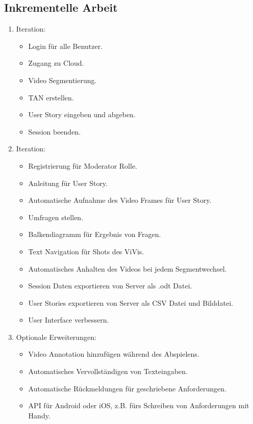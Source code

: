 	\subsection{Inkrementelle Arbeit}
		\begin{enumerate}
			\item Iteration:
			\begin{itemize}
				\item Login für alle Benutzer.
				\item Zugang zu Cloud.
				\item Video Segmentierung.
				\item TAN erstellen.
				\item User Story eingeben und abgeben.
				\item Session beenden.
			\end{itemize}
			\item Iteration:
			\begin{itemize}
				\item Registrierung für Moderator Rolle.
				\item Anleitung für User Story.
				\item Automatische Aufnahme des Video Frames für User Story.
				\item Umfragen stellen.
				\item Balkendiagramm für Ergebnis von Fragen.
				\item Text Navigation für Shots des ViVis.
				\item Automatisches Anhalten des Videos bei jedem Segmentwechsel.
				\item Session Daten exportieren von Server als .odt Datei.
				\item User Stories exportieren von Server als CSV Datei und Bilddatei.
				\item User Interface verbessern.
			\end{itemize}
			\item Optionale Erweiterungen:
			\begin{itemize}
				\item Video Annotation hinzufügen während des Abspielens.
				\item Automatisches Vervollständigen von Texteingaben.
				\item Automatische Rückmeldungen für geschriebene Anforderungen.
				\item API für Android oder iOS, z.B. fürs Schreiben von Anforderungen mit Handy.
			\end{itemize}
		\end{enumerate}


		